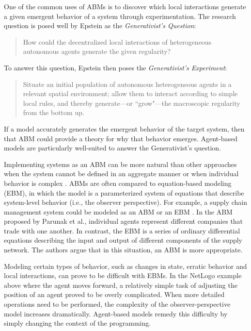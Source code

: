 One of the common uses of ABMs is to discover which local interactions generate a given emergent behavior of a system through experimentation.
The research question is posed well by Epstein as the \textit{Generativist's Question}:
\begin{quote}
   How could the decentralized local interactions of heterogeneous autonomous agents generate the given regularity?
\end{quote}
To answer this question, Epstein then poses the \textit{Generativist's Experiment}:
\begin{quote}
Situate an initial population of autonomous heterogeneous agents in a relevant spatial environment; allow them to interact according to simple local rules, and thereby generate---or ``grow"---the macroscopic regularity from the bottom up. \cite{epstein1999agent}
\end{quote}
If a model accurately generates the emergent behavior of the target system, then that ABM could provide a theory for why that behavior emerges.
Agent-based models are particularly well-suited to answer the Generativist's question.



Implementing systems as an ABM can be more natural than other approaches when the system cannot be defined in an aggregate manner or when individual behavior is complex \cite{bonabeau2002agent}.
ABMs are often compared to equation-based modeling (EBM), in which the model is a parameterized system of equations that describe system-level behavior (i.e., the observer perspective).
For example, a supply chain management system could be modeled as an ABM or an EBM \cite{parunak1998agent}.
In the ABM proposed by Parunak et al., individual agents represent different companies that trade with one another.
In contrast, the EBM is a series of ordinary differential equations describing the input and output of different components of the supply network.
The authors argue that in this situation, an ABM is more appropriate.

Modeling certain types of behavior, such as changes in state, erratic behavior and local interactions, can prove to be difficult with EBMs.
In the NetLogo example above where the agent moves forward, a relatively simple task of adjusting the position of an agent proved to be overly complicated.
When more detailed operations need to be performed, the complexity of the observer-perspective model increases dramatically.
Agent-based models remedy this difficulty by simply changing the context of the programming.


